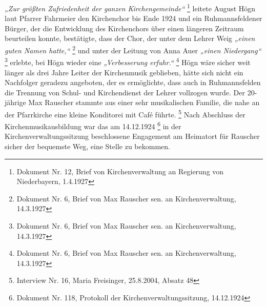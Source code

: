 \documentclass[a4paper]{article}
\newcommand\textstyleZitate[1]{\textit{#1}}
\begin{document}
\textstyleZitate{„Zur größten Zufriedenheit der ganzen Kirchengemeinde“
} \footnote{Dokument Nr. 12, Brief von Kirchenverwaltung an Regierung
von Niederbayern, 1.4.1927} leitete August Högn laut Pfarrer Fahrmeier
den Kirchenchor bis Ende 1924 und ein Ruhmannsfeldener Bürger, der die
Entwicklung des Kirchenchors über einen längeren Zeitraum beurteilen
konnte, bestätigte, dass der Chor, der unter dem Lehrer Weig
\textstyleZitate{„einen guten Namen hatte,“ } \footnote{Dokument Nr. 6,
Brief von Max Rauscher sen. an Kirchenverwaltung, 14.3.1927} und unter
der Leitung von Anna Auer \textstyleZitate{„einen Niedergang“
} \footnote{Dokument Nr. 6, Brief von Max Rauscher sen. an
Kirchenverwaltung, 14.3.1927} erlebte, bei Högn wieder eine
\textstyleZitate{„Verbesserung erfuhr.“ } \footnote{Dokument Nr. 6,
Brief von Max Rauscher sen. an Kirchenverwaltung, 14.3.1927} Högn wäre
sicher weit länger als drei Jahre Leiter der Kirchenmusik geblieben,
hätte sich nicht ein Nachfolger geradezu angeboten, der es ermöglichte,
dass auch in Ruhmannsfelden die Trennung von Schul- und Kirchendienst
der Lehrer vollzogen wurde. Der 20-jährige Max Rauscher stammte aus
einer sehr musikalischen Familie, die nahe an der Pfarrkirche eine
kleine Konditorei mit Café führte. \footnote{Interview Nr. 16, Maria
Freisinger, 25.8.2004, Absatz 48} Nach Abschluss der
Kirchenmusikausbildung war das am 14.12.1924 \footnote{Dokument Nr.
118, Protokoll der Kirchenverwaltungssitzung, 14.12.1924} in der
Kirchenverwaltungssitzung beschlossene Engagement am Heimatort für
Rauscher sicher der bequemste Weg, eine Stelle zu bekommen.
\end{document}
